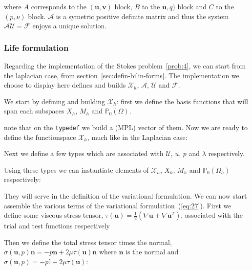 \documentclass[a4paper]{book}
\begin{document}
where $A$ corresponds to the $(\mathbf{u},\mathbf{v})$ block, $B$ to
the $\mathbf{u},q)$ block and $C$ to the $(p,\nu)$
block. $\mathcal{A}$ is a symetric positive definite matrix and thus
the system $\mathcal{A} \mathcal{U} = \mathcal{F}$ enjoys a unique
solution.

\subsubsection{Life formulation}
\label{sec:life-formulation}

Regarding the implementation of the Stokes problem~\ref{prob:4}, we
can start from the laplacian case, from
section~\ref{sec:defin-bilin-forms}. The implementation we choose to
display here defines and builds $\mathcal{X}_h$, $\mathcal{A}$,
$\mathcal{U}$ and $\mathcal{F}$.

We start by defining and building $\mathcal{X}_h$: first we define the
basis functions that will span each subspaces $X_h$, $M_h$ and
$\mathbb{P}_0(\Omega)$.



note that on the \lstinline!typedef! we build a (MPL) vector of them. Now we are
ready to define the functionspace $\mathcal{X}_h$, much like in the
Laplacian case:



Next we define a few types which are associated with $\mathcal{U}$,
$u$, $p$ and $\lambda$ respectively.



Using these types we can instantiate elements of $\mathcal{X}_h$,
$X_h$, $M_h$ and $\mathbb{P}_0(\Omega_h)$ respectively:



They will serve in the definition of the variational formulation. We
can now start assemble the various terms of the variational
formulation~(\ref{eq:27}). First we define some viscous stress tensor,
$\tau(\mathbf{u}) = \frac{1}{2}(\nabla \mathbf{u} + \nabla
\mathbf{u}^T)$, associated with the trial and test functions
respectively



Then we define the total stress tensor times the normal,
$\sigma(\mathbf{u},p) \mathbf{n} = -p \mathbf{n} + 2 \mu \tau(\mathbf{u})
\mathbf{n}$ where $\mathbf{n}$ is the normal and $\sigma(\mathbf{u},p) =
-p \mathbb{I} + 2 \mu \tau(\mathbf{u})$:
\end{document}
